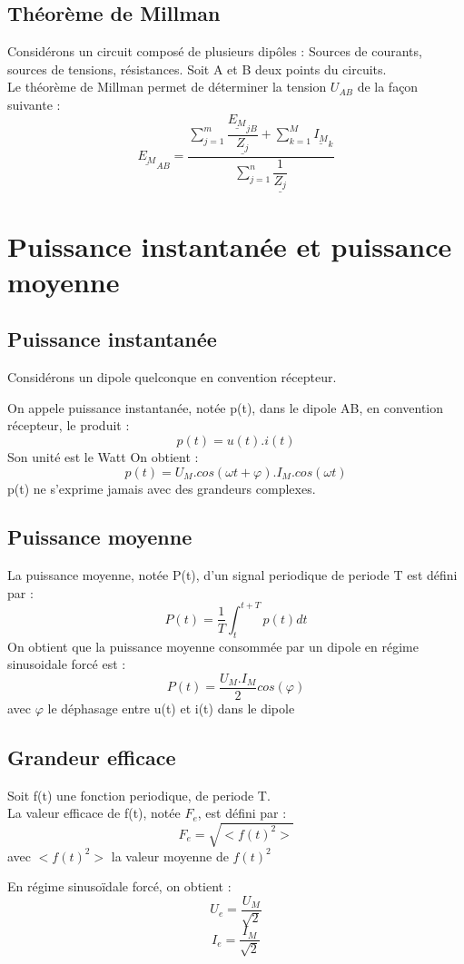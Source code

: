\subsection{Théorème de Millman}
Considérons un circuit composé de plusieurs dipôles : Sources de courants, sources de tensions, résistances.
Soit A et B deux points du circuits.\\
Le théorème de Millman permet de déterminer la tension $U_{AB}$ de la façon suivante :
$$\underline{E_M}_{AB} = \dfrac{\sum_{j=1}^m \dfrac{\underline{E_M}_{jB}}{\underline{Z_j}} + \sum_{k=1}^M \underline{I_M}_k}{\sum_{j=1}^n \dfrac{1}{\underline{Z_j}}}$$
\section{Puissance instantanée et puissance moyenne}
\subsection{Puissance instantanée}
Considérons un dipole quelconque en convention récepteur.
\begin{de}
On appele puissance instantanée, notée p(t), dans le dipole AB, en convention récepteur, le produit :
$$p(t)=u(t).i(t)$$
Son unité est le Watt
On obtient : 
$$p(t) = U_M.cos(\omega t+\varphi).I_M.cos(\omega t)$$
p(t) ne s'exprime jamais avec des grandeurs complexes.
\end{de}
\subsection{Puissance moyenne}
\begin{de}
La puissance moyenne, notée P(t), d'un signal periodique de periode T est défini par :
$$P(t) = \dfrac{1}{T}\int_t^{t+T}p(t)dt$$
On obtient que la puissance moyenne consommée par un dipole en régime sinusoidale forcé est :
$$P(t) = \dfrac{U_M.I_M}{2}cos(\varphi)$$
avec $\varphi$ le déphasage entre u(t) et i(t) dans le dipole 
\end{de}
\subsection{Grandeur efficace}
\begin{de}
Soit f(t) une fonction periodique, de periode T.\\
La valeur efficace de f(t), notée $F_e$, est défini par :
$$F_e = \sqrt{<f(t)^2>}$$
avec $<f(t)^2>$ la valeur moyenne de $f(t)^2$
\end{de}
En régime sinusoïdale forcé, on obtient :
$$U_e = \dfrac{U_M}{\sqrt{2}}$$
$$I_e = \dfrac{I_M}{\sqrt{2}}$$
